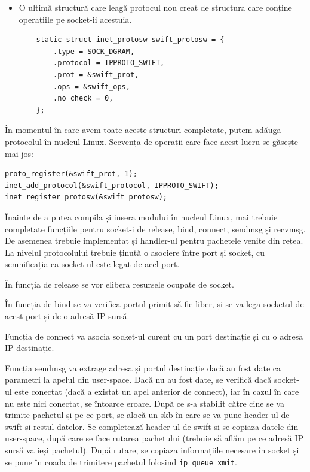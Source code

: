 \begin{itemize}
  \item O ultimă structură care leagă protocul nou creat de structura care
  conține operațiile pe socket-ii acestuia.
    \begin{verbatim}
    static struct inet_protosw swift_protosw = {
        .type = SOCK_DGRAM,
        .protocol = IPPROTO_SWIFT,
        .prot = &swift_prot,
        .ops = &swift_ops,
        .no_check = 0,
    };
    \end{verbatim}
\end{itemize}

În momentul în care avem toate aceste structuri completate, putem adăuga
protocolul în nucleul Linux. Secvența de operații care face acest lucru se
găsește mai jos:

\begin{verbatim}
proto_register(&swift_prot, 1);
inet_add_protocol(&swift_protocol, IPPROTO_SWIFT);
inet_register_protosw(&swift_protosw);
\end{verbatim}

Înainte de a putea compila și insera modului în nucleul Linux, mai trebuie
completate funcțiile pentru socket-i de release, bind, connect, sendmsg și
recvmsg. De asemenea trebuie implementat și handler-ul pentru pachetele venite
din rețea. La nivelul protocolului trebuie ținută o asociere între port și
socket, cu semnificația ca socket-ul este legat de acel port.

În funcția de release se vor elibera resursele ocupate de socket.

În funcția de bind se va verifica portul primit să fie liber, și se va
lega socketul de acest port și de o adresă IP sursă.

Funcția de connect va asocia socket-ul curent cu un port destinație
și cu o adresă IP destinație.

Funcția sendmsg va extrage adresa și portul destinație dacă au fost date ca
parametri la apelul din user-space. Dacă nu au fost date, se verifică dacă
socket-ul este conectat (dacă a existat un apel anterior de connect), iar în
cazul în care nu este nici conectat, se întoarce eroare.  După ce s-a stabilit
către cine se va trimite pachetul și pe ce port, se alocă un skb în care se va
pune header-ul de swift și restul datelor. Se completează header-ul de swift
și se copiaza datele din user-space, după care se face rutarea pachetului
(trebuie să aflăm pe ce adresă IP sursă va ieși pachetul). După rutare, se
copiaza informațiile necesare în socket și se pune în coada de trimitere
pachetul folosind \texttt{ip\_queue\_xmit}.

